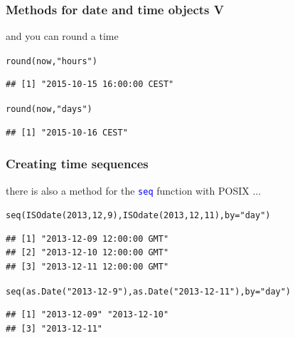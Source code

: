 \documentclass[xcolor=table, xcolor=dvipsnames]{beamer}\usepackage[]{graphicx}\usepackage[]{color}
\makeatletter
\newcommand{\hlnum}[1]{\textcolor[rgb]{0,0,0}{#1}}
\newcommand{\hlstr}[1]{\textcolor[rgb]{0.545,0.137,0.137}{#1}}
\newcommand{\hlstd}[1]{\textcolor[rgb]{0,0,0}{#1}}
\newcommand{\hlkwc}[1]{\textcolor[rgb]{1,0,1}{#1}}
\newcommand{\hlkwd}[1]{\textcolor[rgb]{0,0,1}{#1}}
\newenvironment{kframe}{%
 \def\at@end@of@kframe{}%
 \ifinner\ifhmode%
  \def\at@end@of@kframe{\end{minipage}}%
  \begin{minipage}{\columnwidth}%
 \fi\fi%
 \def\FrameCommand##1{\hskip\@totalleftmargin \hskip-\fboxsep
 \colorbox{shadecolor}{##1}\hskip-\fboxsep
     \hskip-\linewidth \hskip-\@totalleftmargin \hskip\columnwidth}%
 \MakeFramed {\advance\hsize-\width
   \@totalleftmargin\z@ \linewidth\hsize
   \@setminipage}}%
 {\par\unskip\endMakeFramed%
 \at@end@of@kframe}
\newenvironment{knitrout}{}{} %
\newcommand{\rcode}[1]{\texttt{\textcolor{Blue}{#1}}} %
\makeatother
\begin{document}

\begin{frame}[fragile]\frametitle{Methods for date and time objects V}
and you can round a time %
\begin{knitrout}
\color{fgcolor}\begin{kframe}
\begin{alltt}
\hlkwd{round}\hlstd{(now,} \hlstr{"hours"}\hlstd{)}
\end{alltt}
\begin{verbatim}
## [1] "2015-10-15 16:00:00 CEST"
\end{verbatim}
\begin{alltt}
\hlkwd{round}\hlstd{(now,} \hlstr{"days"}\hlstd{)}
\end{alltt}
\begin{verbatim}
## [1] "2015-10-16 CEST"
\end{verbatim}
\end{kframe}
\end{knitrout}
\end{frame}


\begin{frame}[fragile]\frametitle{Creating time sequences}
there is also a method for the \rcode{seq} function with POSIX ... %
\begin{knitrout}
\color{fgcolor}\begin{kframe}
\begin{alltt}
\hlkwd{seq}\hlstd{(}\hlkwd{ISOdate}\hlstd{(}\hlnum{2013}\hlstd{,} \hlnum{12}\hlstd{,}\hlnum{9}\hlstd{),} \hlkwd{ISOdate}\hlstd{(}\hlnum{2013}\hlstd{,} \hlnum{12}\hlstd{,}\hlnum{11}\hlstd{),} \hlkwc{by}\hlstd{=}\hlstr{"day"}\hlstd{)}
\end{alltt}
\begin{verbatim}
## [1] "2013-12-09 12:00:00 GMT"
## [2] "2013-12-10 12:00:00 GMT"
## [3] "2013-12-11 12:00:00 GMT"
\end{verbatim}
\begin{alltt}
\hlkwd{seq}\hlstd{(}\hlkwd{as.Date}\hlstd{(}\hlstr{"2013-12-9"}\hlstd{),} \hlkwd{as.Date}\hlstd{(}\hlstr{"2013-12-11"}\hlstd{),} \hlkwc{by}\hlstd{=}\hlstr{"day"}\hlstd{)}
\end{alltt}
\begin{verbatim}
## [1] "2013-12-09" "2013-12-10"
## [3] "2013-12-11"
\end{verbatim}
\end{kframe}
\end{knitrout}
\end{frame}
\end{document}

